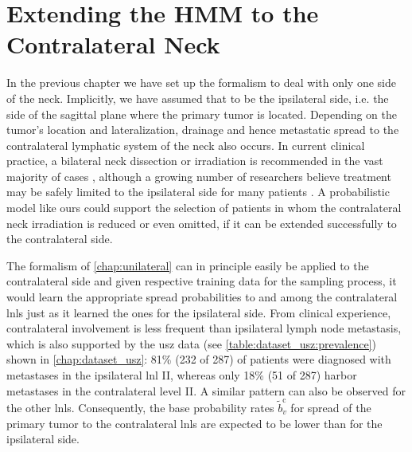 \documentclass[\relativeRoot/main.tex]{subfiles}
\begin{document}
\chapter{Extending the HMM to the Contralateral Neck}
\label{chap:bilateral}
\globalreset

In the previous chapter we have set up the formalism to deal with only one side of the neck. Implicitly, we have assumed that to be the ipsilateral side, i.e. the side of the sagittal plane where the primary tumor is located. Depending on the tumor's location and lateralization, drainage and hence metastatic spread to the contralateral lymphatic system of the neck also occurs. In current clinical practice, a bilateral neck dissection or irradiation is recommended in the vast majority of cases \cite{de_veij_mestdagh_incidence_2019}, although a growing number of researchers believe treatment may be safely limited to the ipsilateral side for many patients \cite{rackley_unilateral_2017,de_veij_mestdagh_spectct-guided_2020}. A probabilistic model like ours could support the selection of patients in whom the contralateral neck irradiation is reduced or even omitted, if it can be extended successfully to the contralateral side.

The formalism of \cref{chap:unilateral} can in principle easily be applied to the contralateral side and given respective training data for the sampling process, it would learn the appropriate spread probabilities to and among the contralateral \glspl{lnl} just as it learned the ones for the ipsilateral side. From clinical experience, contralateral involvement is less frequent than ipsilateral lymph node metastasis, which is also supported by the \gls{usz} data (see \cref{table:dataset_usz:prevalence}) shown in \cref{chap:dataset_usz}: 81\% (232 of 287) of patients were diagnosed with metastases in the ipsilateral \gls{lnl} II, whereas only 18\% (51 of 287) harbor metastases in the contralateral level II. A similar pattern can also be observed for the other \glspl{lnl}. Consequently, the base probability rates $\tilde{b}^\text{c}_v$ for spread of the primary tumor to the contralateral \glspl{lnl} are expected to be lower than for the ipsilateral side.
\end{document}
